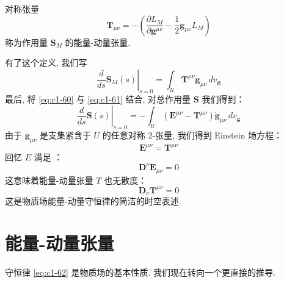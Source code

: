 \begin{definition*}
对称张量
\[
\mathbf{T}_{\mu\nu} = -\left(\frac{\partial L_M}{\partial\mathbf{g}^{\mu\nu}} - \frac{1}{2}\mathbf{g}_{\mu\nu}L_M\right)
\]
称为作用量 $\mathbf{S}_M$ 的能量-动量张量. 
\end{definition*}

有了这个定义, 我们写
\begin{equation}
\left.\frac{d}{ds}\mathbf{S}_M(s)\right|_{s=0} = \int_{\mathcal{U}}\mathbf{T}^{\mu\nu}\dot{\mathbf{g}}_{\mu\nu}\, dv_{\mathbf{g}}\label{eq:c1-61}
\end{equation}
最后, 将 \eqref{eq:c1-60} 与 \eqref{eq:c1-61} 结合, 对总作用量 $\mathbf{S}$ 我们得到：
\[
\left.\frac{d}{ds}\mathbf{S}(s)\right|_{s=0} = -\int_{\mathcal{U}}\left(\mathbf{E}^{\mu\nu} - \mathbf{T}^{\mu\nu}\right)\dot{\mathbf{g}}_{\mu\nu}\, dv_{\mathbf{g}}
\]
由于 $\dot{\mathbf{g}}_{\mu\nu}$ 是支集紧含于 $U$ 的任意对称 2-张量, 我们得到 Einstein 场方程：
\[
\mathbf{E}^{\mu\nu} = \mathbf{T}^{\mu\nu}
\]
回忆  $E$ 满足 ：
\[
\mathbf{D}^\nu\mathbf{E}_{\mu\nu} = 0
\]
这意味着能量-动量张量 $T$ 也无散度：
\begin{equation}
\mathbf{D}_\nu\mathbf{T}^{\mu\nu} = 0\label{eq:c1-62}
\end{equation}
这是物质场能量-动量守恒律的简洁的时空表述. 

\section{能量-动量张量}

守恒律 \eqref{eq:c1-62} 是物质场的基本性质. 我们现在转向一个更直接的推导. 

